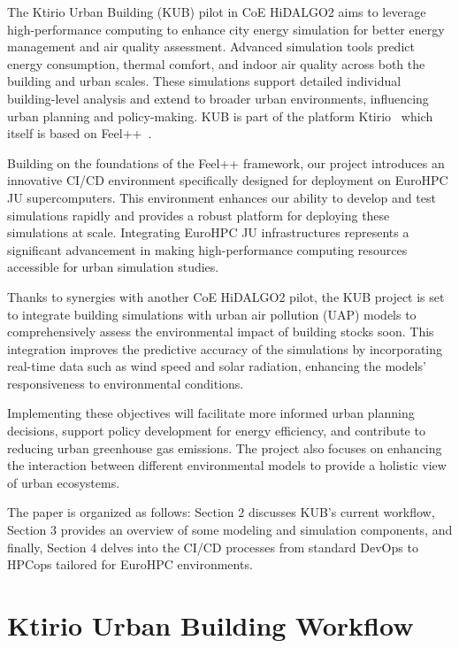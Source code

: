 \documentclass[runningheads]{llncs}
\begin{document}
The Ktirio Urban Building (KUB) pilot in CoE HiDALGO2 aims to leverage high-performance computing to enhance city energy simulation for better energy management and air quality assessment. Advanced simulation tools predict energy consumption, thermal comfort, and indoor air quality across both the building and urban scales. These simulations support detailed individual building-level analysis and extend to broader urban environments, influencing urban planning and policy-making. KUB is part of the platform Ktirio~\cite{cemosis_ktirio_2024} which itself is based on Feel++~\cite{christophe_prudhomme_feelppfeelpp_2024}.

Building on the foundations of the Feel++ framework, our project introduces an innovative CI/CD environment specifically designed for deployment on EuroHPC JU supercomputers. This environment enhances our ability to develop and test simulations rapidly and provides a robust platform for deploying these simulations at scale. Integrating EuroHPC JU infrastructures represents a significant advancement in making high-performance computing resources accessible for urban simulation studies.

Thanks to synergies with another CoE HiDALGO2 pilot, the KUB project is set to integrate building simulations with urban air pollution (UAP) models to comprehensively assess the environmental impact of building stocks soon. This integration improves the predictive accuracy of the simulations by incorporating real-time data such as wind speed and solar radiation, enhancing the models' responsiveness to environmental conditions.

Implementing these objectives will facilitate more informed urban planning decisions, support policy development for energy efficiency, and contribute to reducing urban greenhouse gas emissions. The project also focuses on enhancing the interaction between different environmental models to provide a holistic view of urban ecosystems.

The paper is organized as follows: Section 2 discusses KUB's current workflow, Section 3 provides an overview of some modeling and simulation components, and finally, Section 4 delves into the CI/CD processes from standard DevOps to HPCops tailored for EuroHPC environments.


\section{Ktirio Urban Building Workflow}
\end{document}
